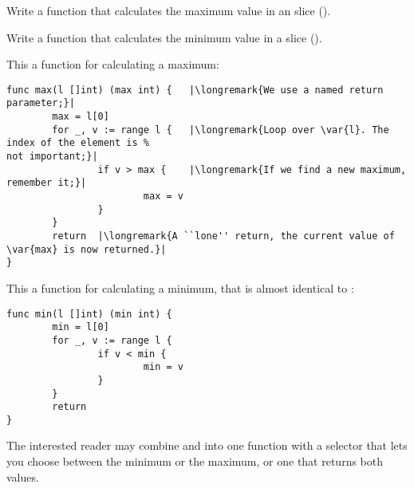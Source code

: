 \begin{Exercise}[title={Minimum and maximum},difficulty=3]
\label{ex:minmax}
\Question\label{ex:minmax q1} Write a function that calculates the
maximum value in an  slice ().

\Question\label{ex:minmax q2} Write a function that calculates the
minimum value in a  slice ().

\end{Exercise}

\begin{Answer}
\Question This a function for calculating a maximum:
\begin{lstlisting}
func max(l []int) (max int) {   |\longremark{We use a named return parameter;}|
        max = l[0]      
        for _, v := range l {   |\longremark{Loop over \var{l}. The index of the element is %
not important;}|
                if v > max {    |\longremark{If we find a new maximum, remember it;}|
                        max = v 
                }   
        }   
        return  |\longremark{A ``lone'' return, the current value of \var{max} is now returned.}|
}
\end{lstlisting}
\showremarks

\Question This a function for calculating a minimum, that is almost identical to :
\begin{lstlisting}
func min(l []int) (min int) {
        min = l[0]
        for _, v := range l { 
                if v < min {
                        min = v 
                }   
        }   
        return
}
\end{lstlisting}
The interested reader may combine  and  into one function with a selector
that lets you choose between the minimum or the maximum, or one that returns both values.
\end{Answer}
